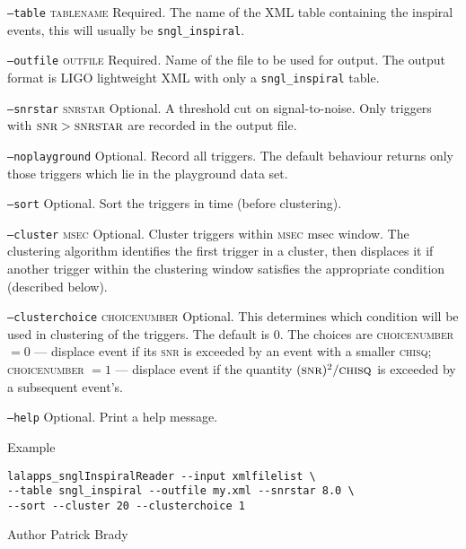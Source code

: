 \begin{entry}
\begin{entry}
\item[\texttt{--table} \textsc{tablename}] Required.  The name of the 
XML table containing the inspiral events, this will usually be 
\texttt{sngl\_inspiral}.

\item[\texttt{--outfile} \textsc{outfile}] Required.  Name of the file
to be used for output.  The output format is LIGO lightweight XML with
only a \texttt{sngl\_inspiral} table.

\item[\texttt{--snrstar} \textsc{snrstar}] Optional.  A threshold cut
on signal-to-noise.  Only triggers with $\textsc{snr} > \textsc{snrstar}$
are recorded in the output file.

\item[\texttt{--noplayground}] Optional.  Record all triggers.  The
default behaviour returns only those triggers which lie in the
playground data set.  

\item[\texttt{--sort}] Optional.   Sort the triggers in time (before
clustering).  

\item[\texttt{--cluster} \textsc{msec}] Optional.  Cluster triggers
within \textsc{msec} msec window.   The clustering algorithm
identifies the first trigger in a cluster, then displaces it if another 
trigger within the clustering window satisfies the appropriate condition 
(described below).

\item[\texttt{--clusterchoice} \textsc{choicenumber}]  Optional.  This
determines which condition will be used in clustering of the triggers.  
The default is 0.  The choices are \textsc{choicenumber} $=0$ --- displace
event if its \textsc{snr} is exceeded by an event with a smaller 
\textsc{chisq}; \textsc{choicenumber} $=1$ --- displace event if the quantity
$(\textsc{snr})^{2}/\textsc{chisq}$ is exceeded by a subsequent event's.

\item[\texttt{--help}] Optional.  Print a help message.
\end{entry}

\item[Example]
\begin{verbatim}
lalapps_snglInspiralReader --input xmlfilelist \
--table sngl_inspiral --outfile my.xml --snrstar 8.0 \
--sort --cluster 20 --clusterchoice 1
\end{verbatim}

\item[Author] 
Patrick Brady
\end{entry}
\clearpage



